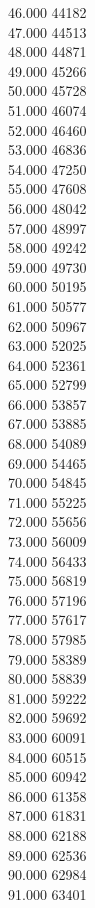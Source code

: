 { 46.000	44182 \\
 47.000	44513 \\
 48.000	44871 \\
 49.000	45266 \\
 50.000	45728 \\
 51.000	46074 \\
 52.000	46460 \\
 53.000	46836 \\
 54.000	47250 \\
 55.000	47608 \\
 56.000	48042 \\
 57.000	48997 \\
 58.000	49242 \\
 59.000	49730 \\
 60.000	50195 \\
 61.000	50577 \\
 62.000	50967 \\
 63.000	52025 \\
 64.000	52361 \\
 65.000	52799 \\
 66.000	53857 \\
 67.000	53885 \\
 68.000	54089 \\
 69.000	54465 \\
 70.000	54845 \\
 71.000	55225 \\
 72.000	55656 \\
 73.000	56009 \\
 74.000	56433 \\
 75.000	56819 \\
 76.000	57196 \\
 77.000	57617 \\
 78.000	57985 \\
 79.000	58389 \\
 80.000	58839 \\
 81.000	59222 \\
 82.000	59692 \\
 83.000	60091 \\
 84.000	60515 \\
 85.000	60942 \\
 86.000	61358 \\
 87.000	61831 \\
 88.000	62188 \\
 89.000	62536 \\
 90.000	62984 \\
 91.000	63401 \\
}
